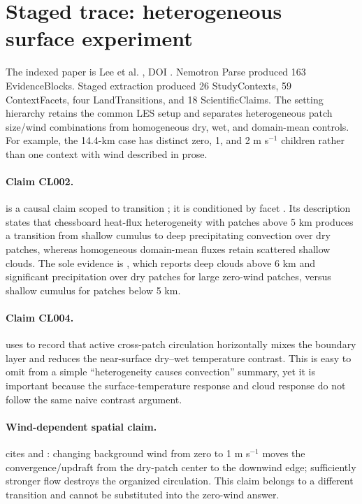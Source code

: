 \section{Staged trace: heterogeneous surface experiment}
The indexed paper is Lee et al. \citep{lee2019}, DOI . Nemotron Parse produced 163 EvidenceBlocks. Staged extraction produced 26 StudyContexts, 59 ContextFacets, four LandTransitions, and 18 ScientificClaims. The setting hierarchy retains the common LES setup and separates heterogeneous patch size/wind combinations from homogeneous dry, wet, and domain-mean controls. For example, the 14.4-km case has distinct zero, 1, and 2 m s$^{-1}$ children rather than one context with wind described in prose.

\paragraph{Claim CL002.}
 is a causal claim scoped to transition ; it is conditioned by facet . Its description states that chessboard heat-flux heterogeneity with patches above 5 km produces a transition from shallow cumulus to deep precipitating convection over dry patches, whereas homogeneous domain-mean fluxes retain scattered shallow clouds. The sole evidence is , which reports deep clouds above 6 km and significant precipitation over dry patches for large zero-wind patches, versus shallow cumulus for patches below 5 km.

\paragraph{Claim CL004.}
 uses  to record that active cross-patch circulation horizontally mixes the boundary layer and reduces the near-surface dry--wet temperature contrast. This is easy to omit from a simple ``heterogeneity causes convection'' summary, yet it is important because the surface-temperature response and cloud response do not follow the same naive contrast argument.

\paragraph{Wind-dependent spatial claim.}
 cites  and : changing background wind from zero to 1 m s$^{-1}$ moves the convergence/updraft from the dry-patch center to the downwind edge; sufficiently stronger flow destroys the organized circulation. This claim belongs to a different transition and cannot be substituted into the zero-wind answer.


